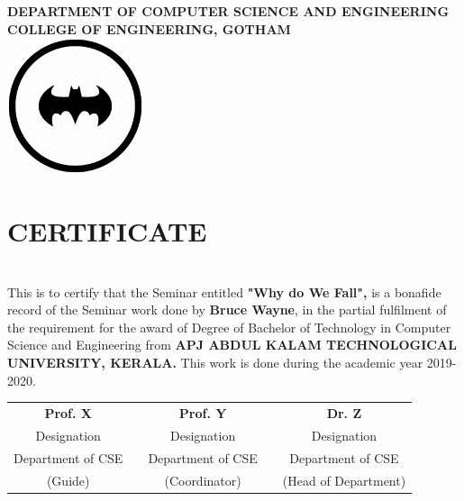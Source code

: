 \begin{center}

\bf{\Large {DEPARTMENT OF COMPUTER SCIENCE AND ENGINEERING}
}\\[0.2cm]
\normalsize
\textsc{\Large{COLLEGE OF ENGINEERING, GOTHAM}}\\[0.9cm]

    \includegraphics[width = 40mm]{logo.png}

\end{center}
\section*{\centering CERTIFICATE}
\linespread{1}

\noindent \\This is to certify that the Seminar entitled \textbf{"Why do We Fall",} is a bonafide record of the Seminar work done by \textbf{Bruce Wayne}, in the partial  fulfilment of the requirement for the award of Degree of Bachelor of  Technology in Computer Science and Engineering from \textbf{APJ ABDUL KALAM TECHNOLOGICAL UNIVERSITY, KERALA.} This work is done  during the academic year 2019-2020.

\vspace{2cm}

\begin{center}
\begin{tabular}{c c c c c} 
\centering
 \textbf{Prof. X}     && \textbf{Prof. Y}    && \textbf{Dr. Z} \\ 
    Designation        &&  Designation      && Designation \\ 
    Department of CSE          &&  Department of CSE        && Department of CSE \\
    (Guide)            &&  (Coordinator)    && (Head of Department) \\


\end{tabular}
\end{center}
\thispagestyle{empty}
\newpage
